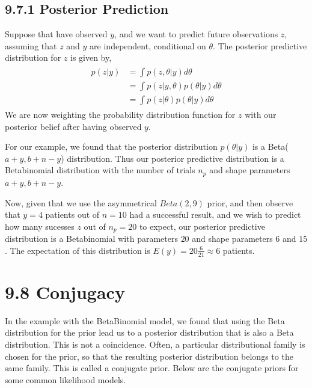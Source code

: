 \documentclass[letterpaper,10pt,english]{jupyterBook}
\begin{document}
\subsection{9.7.1 Posterior Prediction}
\label{\detokenize{09.h. Bayesian Statistics I:posterior-prediction}}
\sphinxAtStartPar
Suppose that have observed \(y\), and we want to predict future observations \(z\), assuming that \(z\) and \(y\) are independent, conditional on \(\theta\). The posterior predictive distribution for \(z\) is given by,
\begin{equation*}
\begin{split}
\begin{align*}
p(z|y) &= \int p(z, \theta | y) d \theta \\
     &= \int p(z |y, \theta) p(\theta |y ) d \theta \\ 
      &= \int p(z | \theta) p(\theta |y ) d \theta 
\end{align*}
\end{split}
\end{equation*}
\sphinxAtStartPar
We are now weighting the probability distribution function for \(z\) with our posterior belief after having observed \(y\).

\sphinxAtStartPar
For our example, we found that the posterior distribution \(p(\theta |y ) \) is a Beta(\(a+y, b+n-y\)) distribution. Thus our posterior predictive distribution is a Beta\sphinxhyphen{}binomial distribution with the number of trials \(n_p\) and shape parameters \(a+y, b+n-y\).

\sphinxAtStartPar
Now, given that we use the asymmetrical \(Beta(2, 9)\) prior, and then observe that \(y=4\) patients out of \(n=10\) had a successful result, and we wish to predict how many sucesses \(z\) out of \(n_p=20\) to expect, our posterior predictive distribution is a Beta\sphinxhyphen{}binomial with parameters \(20\) and shape parameters \(6\) and \(15\). The expectation of this distribution is \(E(y) =  20 \frac{6}{21} \approx 6\) patients.


\section{9.8 Conjugacy}
\label{\detokenize{09.i. Bayesian Statistics I:conjugacy}}\label{\detokenize{09.i. Bayesian Statistics I::doc}}
\sphinxAtStartPar
In the example with the Beta\sphinxhyphen{}Binomial model, we found that using the Beta distribution for the prior lead us to a posterior distribution that is also a Beta distribution. This is not a coincidence. Often, a particular distributional family is chosen for the prior, so that the resulting posterior distribution belongs to the same family. This is called a conjugate prior. Below are the conjugate priors for some common likelihood models.
\end{document}
